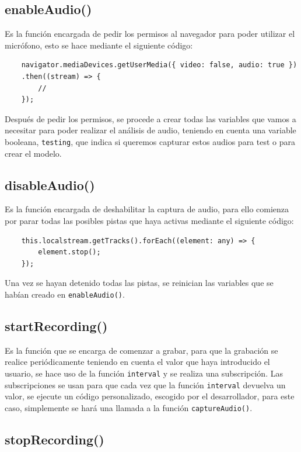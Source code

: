 \documentclass[a4paper, 12pt]{book}
\begin{document}
\subsection*{enableAudio()}

Es la función encargada de pedir los permisos al navegador para poder utilizar el micrófono, esto se hace mediante el siguiente código:

{\footnotesize
\begin{verbatim}
	navigator.mediaDevices.getUserMedia({ video: false, audio: true })
	.then((stream) => {
		//
	});
\end{verbatim}
}

Después de pedir los permisos, se procede a crear todas las variables que vamos a necesitar para poder realizar el análisis de audio, teniendo en cuenta una variable booleana, \texttt{testing}, que indica si queremos capturar estos audios para test o para crear el modelo.

\subsection*{disableAudio()}

Es la función encargada de deshabilitar la captura de audio, para ello comienza por parar todas las posibles pistas que haya activas mediante el siguiente código:

{\footnotesize
\begin{verbatim}
	this.localstream.getTracks().forEach((element: any) => {
		element.stop();
	});
\end{verbatim}
}

Una vez se hayan detenido todas las pistas, se reinician las variables que se habían creado en \texttt{enableAudio()}.

\subsection*{startRecording()}

Es la función que se encarga de comenzar a grabar, para que la grabación se realice periódicamente teniendo en cuenta el valor que haya introducido el usuario, se hace uso de la función \texttt{interval} y se realiza una subscripción. Las subscripciones se usan para que cada vez que la función \texttt{interval} devuelva un valor, se ejecute un código personalizado, escogido por el desarrollador, para este caso, simplemente se hará una llamada a la función \texttt{captureAudio()}.

\subsection*{stopRecording()}
\end{document}
